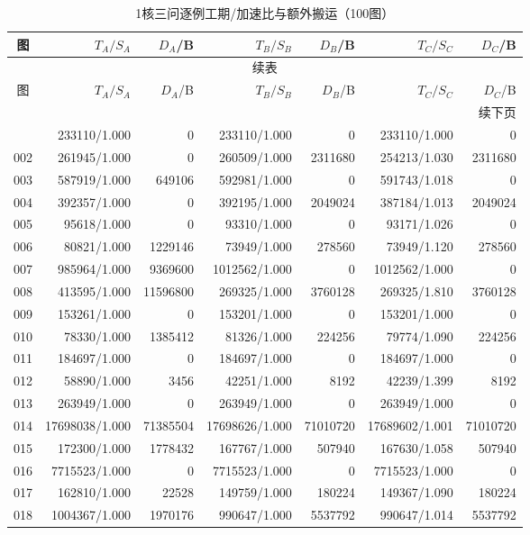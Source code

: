 \begin{longtable}{crrrrrr}
\caption{1核三问逐例工期/加速比与额外搬运（100图）}\label{tab:detail-1}\\
\toprule
图 & $T_A/S_A$ & $D_A$/B & $T_B/S_B$ & $D_B$/B & $T_C/S_C$ & $D_C$/B \\
\midrule
\endfirsthead
\multicolumn{7}{c}{续表}\\
\toprule
图 & $T_A/S_A$ & $D_A$/B & $T_B/S_B$ & $D_B$/B & $T_C/S_C$ & $D_C$/B \\
\midrule
\endhead
\midrule\multicolumn{7}{r}{续下页}\\
\endfoot
\bottomrule
\endlastfoot
001 & 233110/1.000 & 0 & 233110/1.000 & 0 & 233110/1.000 & 0 \\
002 & 261945/1.000 & 0 & 260509/1.000 & 2311680 & 254213/1.030 & 2311680 \\
003 & 587919/1.000 & 649106 & 592981/1.000 & 0 & 591743/1.018 & 0 \\
004 & 392357/1.000 & 0 & 392195/1.000 & 2049024 & 387184/1.013 & 2049024 \\
005 & 95618/1.000 & 0 & 93310/1.000 & 0 & 93171/1.026 & 0 \\
006 & 80821/1.000 & 1229146 & 73949/1.000 & 278560 & 73949/1.120 & 278560 \\
007 & 985964/1.000 & 9369600 & 1012562/1.000 & 0 & 1012562/1.000 & 0 \\
008 & 413595/1.000 & 11596800 & 269325/1.000 & 3760128 & 269325/1.810 & 3760128 \\
009 & 153261/1.000 & 0 & 153201/1.000 & 0 & 153201/1.000 & 0 \\
010 & 78330/1.000 & 1385412 & 81326/1.000 & 224256 & 79774/1.090 & 224256 \\
011 & 184697/1.000 & 0 & 184697/1.000 & 0 & 184697/1.000 & 0 \\
012 & 58890/1.000 & 3456 & 42251/1.000 & 8192 & 42239/1.399 & 8192 \\
013 & 263949/1.000 & 0 & 263949/1.000 & 0 & 263949/1.000 & 0 \\
014 & 17698038/1.000 & 71385504 & 17698626/1.000 & 71010720 & 17689602/1.001 & 71010720 \\
015 & 172300/1.000 & 1778432 & 167767/1.000 & 507940 & 167630/1.058 & 507940 \\
016 & 7715523/1.000 & 0 & 7715523/1.000 & 0 & 7715523/1.000 & 0 \\
017 & 162810/1.000 & 22528 & 149759/1.000 & 180224 & 149367/1.090 & 180224 \\
018 & 1004367/1.000 & 1970176 & 990647/1.000 & 5537792 & 990647/1.014 & 5537792 \\

\end{longtable}
